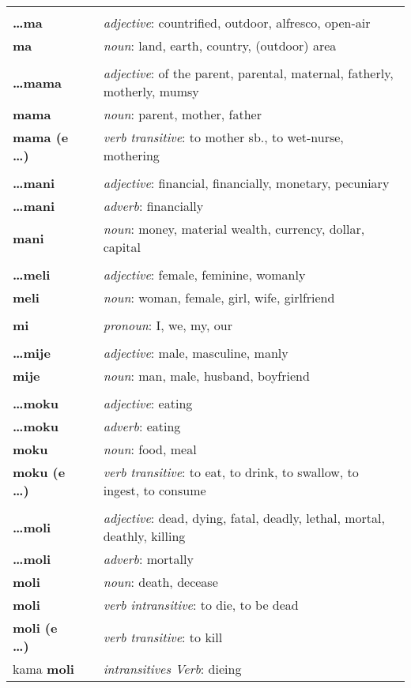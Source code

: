 \begin{supertabular}{p{2,5cm}|ll}
 && \\ %
\textbf{\dots ma} && \textit{adjective}: countrified, outdoor, alfresco, open-air \\ 
\textbf{ma} && \textit{noun}: land, earth, country, (outdoor) area \\ 
 && \\ %
\textbf{\dots mama} && \textit{adjective}: of the parent, parental, maternal, fatherly, motherly, mumsy \\ 
\textbf{mama} && \textit{noun}: parent, mother, father \\ 
\textbf{mama (e \dots)} && \textit{verb transitive}: to mother sb., to wet-nurse, mothering \\ 
 && \\ %
\textbf{\dots mani} && \textit{adjective}: financial, financially, monetary, pecuniary \\ 
\textbf{\dots mani} && \textit{adverb}: financially \\ 
\textbf{mani} && \textit{noun}: money, material wealth, currency, dollar, capital \\ 
 && \\ %
\textbf{\dots meli} && \textit{adjective}: female, feminine, womanly \\ 
\textbf{meli} && \textit{noun}: woman, female, girl, wife, girlfriend \\ 
 && \\ %
\textbf{mi} && \textit{pronoun}: I, we, my, our \\ 
 && \\ %
\textbf{\dots mije} && \textit{adjective}: male, masculine, manly \\ 
\textbf{mije} && \textit{noun}: man, male, husband, boyfriend \\ 
 && \\ %
\textbf{\dots moku} && \textit{adjective}: eating \\ 
\textbf{\dots moku} && \textit{adverb}: eating \\ 
\textbf{moku} && \textit{noun}: food, meal \\ 
\textbf{moku (e \dots)} && \textit{verb transitive}: to eat, to drink, to swallow, to ingest, to consume \\ 
 && \\ %
\textbf{\dots moli} && \textit{adjective}: dead, dying, fatal, deadly, lethal, mortal, deathly, killing \\ 
\textbf{\dots moli} && \textit{adverb}: mortally \\ 
\textbf{moli} && \textit{noun}: death, decease \\ 
\textbf{moli} && \textit{verb intransitive}: to die, to be dead \\ 
\textbf{moli (e \dots)} && \textit{verb transitive}: to kill \\ 
kama \textbf{moli} && \textit{intransitives Verb}: dieing \\ 


\end{supertabular}
